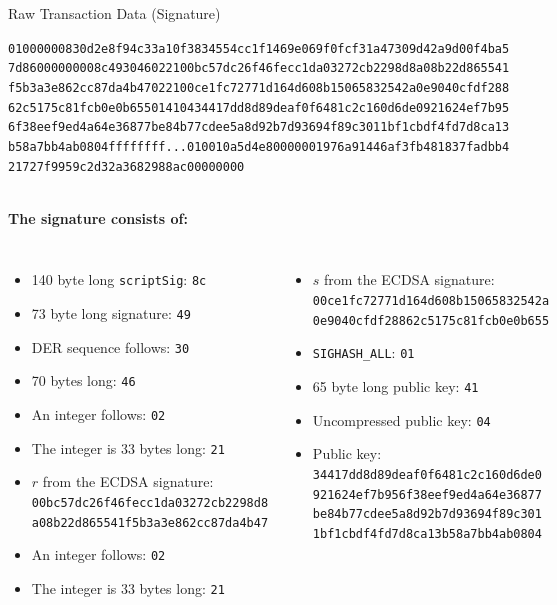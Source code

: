 \documentclass[handout]{beamer}
\begin{document}
\begin{frame}{Raw Transaction Data (Signature)}
\begin{scriptsize}
\texttt{\textcolor{black!30}{01000000830d2e8f94c33a10f3834554cc1f1469e069f0fcf31a47309d42a9d00f4ba5
7d8600000000}{\alert<2>{8c}\alert<3>{49}\alert<4>{30}\alert<5>{46}\alert<6>{02}\alert<7>{21}\alert<8>{00bc57dc26f46fecc1da03272cb2298d8a08b22d865541
f5b3a3e862cc87da4b47}\alert<9>{02}\alert<10>{21}\alert<11>{00ce1fc72771d164d608b15065832542a0e9040cfdf288
62c5175c81fcb0e0b655}\alert<12>{01}\alert<13>{41}\alert<14>{04}\alert<15>{34417dd8d89deaf0f6481c2c160d6de0921624ef7b95
6f38eef9ed4a64e36877be84b77cdee5a8d92b7d93694f89c3011bf1cbdf4fd7d8ca13
b58a7bb4ab0804}}\textcolor{black!30}{ffffffff...010010a5d4e80000001976a91446af3fb481837fadbb4
21727f9959c2d32a3682988ac00000000}}
\end{scriptsize}
\vspace{1em}
\scriptsize \\
\textbf{The signature consists of:}\\
\begin{columns}[T]
\begin{itemize}
	\item \alert<2>{140 byte long \texttt{scriptSig}: \texttt{8c}}
	\item \alert<3>{73 byte long signature: \texttt{49}}
	\item \alert<4>{DER sequence follows: \texttt{30}}
	\item \alert<5>{70 bytes long: \texttt{46}}
	\item \alert<6>{An integer follows: \texttt{02}}
	\item \alert<7>{The integer is 33 bytes long: \texttt{21}}
	\item \alert<8>{$r$ from the ECDSA signature: 	\texttt{00bc57dc26f46fecc1da03272cb2298d8\\
	a08b22d865541f5b3a3e862cc87da4b47}}
	\item \alert<9>{An integer follows: \texttt{02}}
	\item \alert<10>{The integer is 33 bytes long: \texttt{21}}
\end{itemize}
\begin{itemize}
	\item \alert<11>{$s$ from the ECDSA signature: \texttt{00ce1fc72771d164d608b15065832542a\\
	0e9040cfdf28862c5175c81fcb0e0b655}}
	\item \alert<12>{\texttt{SIGHASH\_ALL}: \texttt{01}}
	\item \alert<13>{65 byte long public key: \texttt{41}}
	\item \alert<14>{Uncompressed public key: \texttt{04}}
	\item \alert<15>{Public key: \texttt{34417dd8d89deaf0f6481c2c160d6de0\\
	921624ef7b956f38eef9ed4a64e36877\\
	be84b77cdee5a8d92b7d93694f89c301\\
	1bf1cbdf4fd7d8ca13b58a7bb4ab0804}}
\end{itemize}
\end{columns}
\end{frame}
\end{document}

